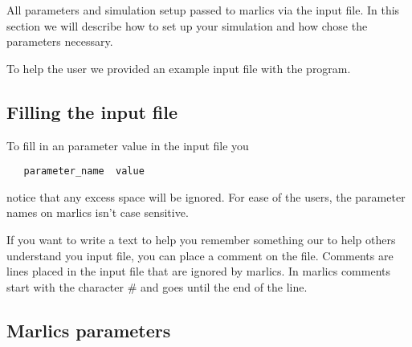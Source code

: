 \documentclass{article}
\begin{document}
All parameters and simulation setup  passed to marlics via the input file. In this section we will describe how to set up your simulation and how chose the parameters necessary.

To help the user we provided an example input file with the program.

\subsection{Filling the input file}

To fill in an parameter value in the input file you
\begin{lstlisting}
   parameter_name  value
\end{lstlisting}
notice that any excess space will be ignored. For ease of the users, the parameter names on marlics isn't case sensitive.


If you want to write a text to help you remember something our to help others understand you input file, you can place a comment on the file. Comments are lines placed in the input file that are ignored by marlics. In marlics comments start with the character \# and goes until the end of the line.

\subsection{Marlics parameters}
\end{document}
